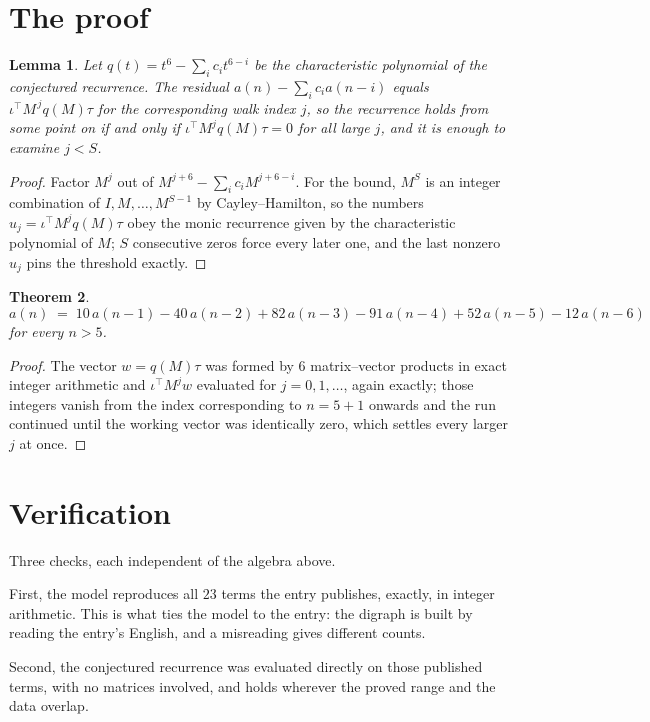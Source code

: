 \documentclass[11pt,a4paper]{article}
\theoremstyle{plain}
\newtheorem{theorem}{Theorem}
\newtheorem{lemma}[theorem]{Lemma}
\theoremstyle{definition}
\begin{document}
\section{The proof}

\begin{lemma}\label{lem:crit}
Let $q(t)=t^{6}-\sum_i c_it^{6-i}$ be the characteristic polynomial of the
conjectured recurrence. The residual $a(n)-\sum_ic_ia(n-i)$ equals
$\iota^{\!\top}M^{\,j}q(M)\tau$ for the corresponding walk index $j$, so the recurrence
holds from some point on if and only if $\iota^{\!\top}M^{j}q(M)\tau=0$ for all large $j$,
and it is enough to examine $j<S$.
\end{lemma}

\begin{proof}
Factor $M^{j}$ out of $M^{j+6}-\sum_ic_iM^{j+6-i}$. For the bound, $M^{S}$
is an integer combination of $I,M,\dots,M^{S-1}$ by Cayley--Hamilton, so the numbers
$u_j=\iota^{\!\top}M^{j}q(M)\tau$ obey the monic recurrence given by the characteristic
polynomial of $M$; $S$ consecutive zeros force every later one, and the last nonzero $u_j$
pins the threshold exactly.
\end{proof}

\begin{theorem}
\[
a(n)\;=\;10\,a(n-1) - 40\,a(n-2) + 82\,a(n-3) - 91\,a(n-4) + 52\,a(n-5) - 12\,a(n-6)
\]
for every $n>5$.
\end{theorem}

\begin{proof}
The vector $w=q(M)\tau$ was formed by $6$ matrix--vector products in exact integer
arithmetic and $\iota^{\!\top}M^{j}w$ evaluated for $j=0,1,\dots$, again exactly; those
integers vanish from the index corresponding to $n=5+1$ onwards and the run continued
until the working vector was identically zero, which settles every larger $j$ at once.
\end{proof}

\section{Verification}

Three checks, each independent of the algebra above.

First, the model reproduces all $23$ terms the entry publishes, exactly, in integer
arithmetic. This is what ties the model to the entry: the digraph is built by reading the
entry's English, and a misreading gives different counts.

Second, the conjectured recurrence was evaluated directly on those published terms, with no
matrices involved, and holds wherever the proved range and the data overlap.
\end{document}
